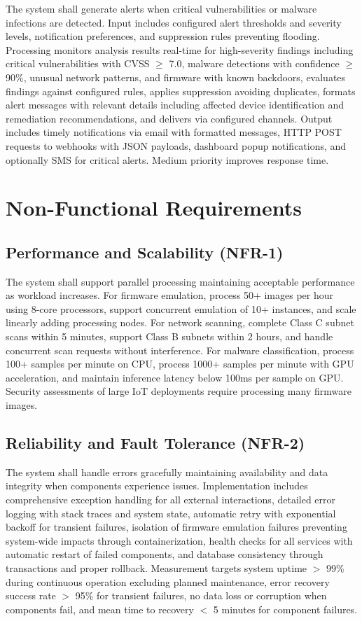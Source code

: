 The system shall generate alerts when critical vulnerabilities or malware infections are detected. Input includes configured alert thresholds and severity levels, notification preferences, and suppression rules preventing flooding. Processing monitors analysis results real-time for high-severity findings including critical vulnerabilities with CVSS $\geq$ 7.0, malware detections with confidence $\geq$ 90\%, unusual network patterns, and firmware with known backdoors, evaluates findings against configured rules, applies suppression avoiding duplicates, formats alert messages with relevant details including affected device identification and remediation recommendations, and delivers via configured channels. Output includes timely notifications via email with formatted messages, HTTP POST requests to webhooks with JSON payloads, dashboard popup notifications, and optionally SMS for critical alerts. Medium priority improves response time.

\section{Non-Functional Requirements}

\subsection{Performance and Scalability (NFR-1)}

The system shall support parallel processing maintaining acceptable performance as workload increases. For firmware emulation, process 50+ images per hour using 8-core processors, support concurrent emulation of 10+ instances, and scale linearly adding processing nodes. For network scanning, complete Class C subnet scans within 5 minutes, support Class B subnets within 2 hours, and handle concurrent scan requests without interference. For malware classification, process 100+ samples per minute on CPU, process 1000+ samples per minute with GPU acceleration, and maintain inference latency below 100ms per sample on GPU. Security assessments of large IoT deployments require processing many firmware images.

\subsection{Reliability and Fault Tolerance (NFR-2)}

The system shall handle errors gracefully maintaining availability and data integrity when components experience issues. Implementation includes comprehensive exception handling for all external interactions, detailed error logging with stack traces and system state, automatic retry with exponential backoff for transient failures, isolation of firmware emulation failures preventing system-wide impacts through containerization, health checks for all services with automatic restart of failed components, and database consistency through transactions and proper rollback. Measurement targets system uptime $>$ 99\% during continuous operation excluding planned maintenance, error recovery success rate $>$ 95\% for transient failures, no data loss or corruption when components fail, and mean time to recovery $<$ 5 minutes for component failures.

